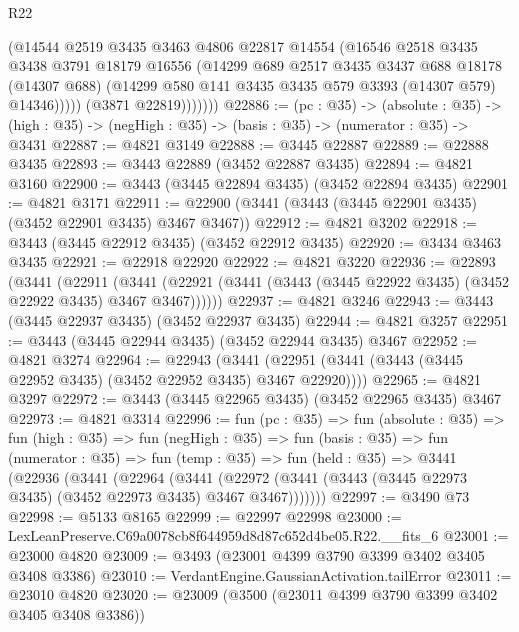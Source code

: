 \begin{lexlean}{R22}
\begin{coremodule}
                  (@14544
                    @2519
                    @3435
                    @3463
                    @4806
                    @22817
                    @14554
                    (@16546
                      @2518
                      @3435
                      @3438
                      @3791
                      @18179
                      @16556
                      (@14299
                        @689
                        @2517
                        @3435
                        @3437
                        @688
                        @18178
                        (@14307 @688)
                        (@14299 @580 @141 @3435 @3435 @579 @3393 (@14307 @579) @14346)))))
                (@3871 @22819)))))))
@22886 := (pc : @35) ->
  (absolute : @35) -> (high : @35) -> (negHigh : @35) -> (basis : @35) -> (numerator : @35) -> @3431
@22887 := @4821 @3149
@22888 := @3445 @22887
@22889 := @22888 @3435
@22893 := @3443 @22889 (@3452 @22887 @3435)
@22894 := @4821 @3160
@22900 := @3443 (@3445 @22894 @3435) (@3452 @22894 @3435)
@22901 := @4821 @3171
@22911 := @22900 (@3441 (@3443 (@3445 @22901 @3435) (@3452 @22901 @3435) @3467 @3467))
@22912 := @4821 @3202
@22918 := @3443 (@3445 @22912 @3435) (@3452 @22912 @3435)
@22920 := @3434 @3463 @3435
@22921 := @22918 @22920
@22922 := @4821 @3220
@22936 := @22893
    (@3441
      (@22911
        (@3441 (@22921 (@3441 (@3443 (@3445 @22922 @3435) (@3452 @22922 @3435) @3467 @3467))))))
@22937 := @4821 @3246
@22943 := @3443 (@3445 @22937 @3435) (@3452 @22937 @3435)
@22944 := @4821 @3257
@22951 := @3443 (@3445 @22944 @3435) (@3452 @22944 @3435) @3467
@22952 := @4821 @3274
@22964 := @22943
    (@3441 (@22951 (@3441 (@3443 (@3445 @22952 @3435) (@3452 @22952 @3435) @3467 @22920))))
@22965 := @4821 @3297
@22972 := @3443 (@3445 @22965 @3435) (@3452 @22965 @3435) @3467
@22973 := @4821 @3314
@22996 := fun (pc : @35) =>
  fun (absolute : @35) =>
  fun (high : @35) =>
  fun (negHigh : @35) =>
  fun (basis : @35) =>
  fun (numerator : @35) =>
  fun (temp : @35) =>
  fun (held : @35) =>
  @3441
    (@22936
      (@3441
        (@22964
          (@3441 (@22972 (@3441 (@3443 (@3445 @22973 @3435) (@3452 @22973 @3435) @3467 @3467)))))))
@22997 := @3490 @73
@22998 := @5133 @8165
@22999 := @22997 @22998
@23000 := LexLeanPreserve.C69a0078cb8f644959d8d87c652d4be05.R22.__fits_6
@23001 := @23000 @4820
@23009 := @3493 (@23001 @4399 @3790 @3399 @3402 @3405 @3408 @3386)
@23010 := VerdantEngine.GaussianActivation.tailError
@23011 := @23010 @4820
@23020 := @23009 (@3500 (@23011 @4399 @3790 @3399 @3402 @3405 @3408 @3386))

\end{coremodule}
\end{lexlean}
